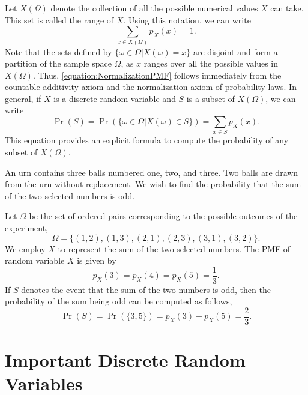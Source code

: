 Let $X(\Omega)$ denote the collection of all the possible numerical values $X$ can take.
This set is called the range of $X$.
Using this notation, we can write
\begin{equation} \label{equation:NormalizationPMF}
\sum_{x \in X(\Omega)} p_X(x) = 1 .
\end{equation}
Note that the sets defined by $\{ \omega \in \Omega | X(\omega) = x \}$ are disjoint and form a partition of the sample space $\Omega$, as $x$ ranges over all the possible values in $X (\Omega)$.
Thus, \eqref{equation:NormalizationPMF} follows immediately from the countable additivity axiom and the normalization axiom of probability laws.
In general, if $X$ is a discrete random variable and $S$ is a subset of $X(\Omega)$, we can write
\begin{equation} \label{equation:FunctionPMF}
\Pr (S) = \Pr \left( \{ \omega \in \Omega | X(\omega) \in S \} \right) = \sum_{x \in S} p_X (x) .
\end{equation}
This equation provides an explicit formula to compute the probability of any subset of $X (\Omega)$.

\begin{example}
An urn contains three balls numbered one, two, and three.
Two balls are drawn from the urn without replacement.
We wish to find the probability that the sum of the two selected numbers is odd.

Let $\Omega$ be the set of ordered pairs corresponding to the possible outcomes of the experiment,
\begin{equation*}
\Omega = \{ (1, 2), (1, 3), (2, 1), (2, 3), (3, 1), (3, 2) \}.
\end{equation*}
We employ $X$ to represent the sum of the two selected numbers.
The PMF of random variable $X$ is given by
\begin{equation*}
p_X (3) = p_X (4) = p_X (5) = \frac{1}{3}.
\end{equation*}
If $S$ denotes the event that the sum of the two numbers is odd, then the probability of the sum being odd can be computed as follows,
\begin{equation*}
\Pr (S) = \Pr ( \{ 3, 5 \} )
= p_X (3) + p_X (5) = \frac{2}{3} .
\end{equation*}
\end{example}

\section{Important Discrete Random Variables}

